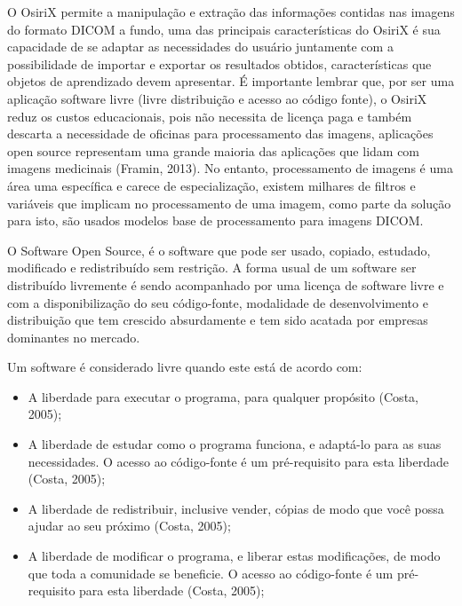 \documentclass[12pt,openright,oneside,a4paper,english,french,spanish,brazil]{unifil}
\begin{document}
O OsiriX permite a manipulação e extração das informações contidas nas imagens do formato DICOM a fundo, uma das principais características do OsiriX é sua capacidade de se adaptar as necessidades do usuário juntamente com a possibilidade de importar e exportar os resultados obtidos, características que objetos de aprendizado devem apresentar. É importante lembrar que, por ser uma aplicação software livre (livre distribuição e acesso ao código fonte), o OsiriX reduz os custos educacionais, pois não necessita de licença paga e também descarta a necessidade de oficinas para processamento das imagens, aplicações open source representam uma grande maioria das aplicações que lidam com imagens medicinais (Framin, 2013). No entanto, processamento de imagens é uma área uma específica e carece de especialização, existem milhares de filtros e variáveis que implicam no processamento de uma imagem, como parte da solução para isto, são usados modelos base de processamento para imagens DICOM.

O Software Open Source, é o software que pode ser usado, copiado, estudado, modificado e redistribuído sem restrição. A forma usual de um software ser distribuído livremente é sendo acompanhado por uma licença de software livre e com a disponibilização do seu código-fonte, modalidade de desenvolvimento e distribuição que tem crescido absurdamente e tem sido acatada por empresas dominantes no mercado.

Um software é considerado livre quando este está de acordo com:
\begin{itemize}
\item A liberdade para executar o programa, para qualquer propósito (Costa, 2005);
\item A liberdade de estudar como o programa funciona, e adaptá-lo para as suas necessidades. O acesso ao código-fonte é um pré-requisito para esta liberdade (Costa, 2005);
\item A liberdade de redistribuir, inclusive vender, cópias de modo que você possa ajudar ao seu próximo (Costa, 2005);
\item A liberdade de modificar o programa, e liberar estas modificações, de modo que toda a comunidade se beneficie. O acesso ao código-fonte é um pré-requisito para esta liberdade (Costa, 2005); 
\end{itemize}
\end{document}
